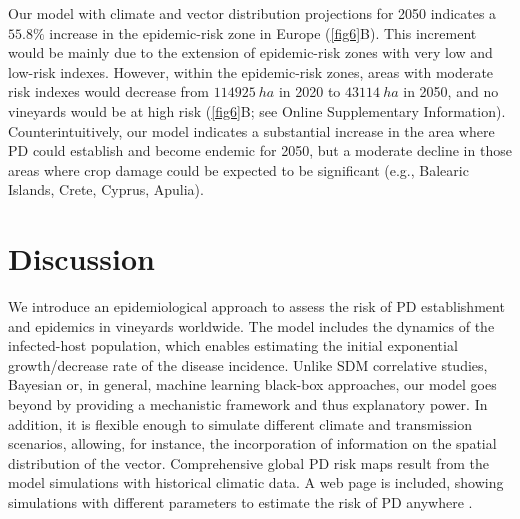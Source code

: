     Our model with climate and vector distribution projections for 2050
    indicates a
$ 55.8 \% $ increase in the epidemic-risk zone in Europe (\cref{fig6}B). This
    increment would be mainly due to the extension of epidemic-risk zones with
    very
    low and low-risk indexes. However, within the epidemic-risk zones, areas
    with
    moderate risk indexes would decrease from $\SI{114925}{ha}$ in 2020 to
$\SI{43114}{ha}$ in 2050, and no vineyards would be at high risk (\cref{fig6}B;
    see Online Supplementary Information). Counterintuitively, our
    model
    indicates a substantial increase in the area where PD could establish and
    become endemic for 2050, but a moderate decline in those areas where crop
    damage could be expected to be significant (e.g., Balearic Islands, Crete,
    Cyprus, Apulia).

    \section{Discussion}

    We introduce an epidemiological approach to assess the risk of PD
    establishment
    and epidemics in vineyards worldwide. The model includes the dynamics of
    the
    infected-host population, which enables estimating the initial exponential
    growth/decrease rate of the disease incidence. Unlike SDM correlative
    studies,
    Bayesian or, in general, machine learning black-box approaches, our model
    goes
    beyond by providing a mechanistic framework and thus explanatory power. In
    addition, it is flexible enough to simulate different climate and
    transmission
    scenarios, allowing, for instance, the incorporation of information on the
    spatial distribution of the vector. Comprehensive global PD risk maps
    result
    from the model simulations with historical climatic data. A web page is
    included, showing simulations with different parameters to estimate the
    risk of
    PD anywhere \cite{Webpage}.

